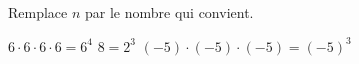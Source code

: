 %
%
	Remplace \(n\) par le nombre qui convient.
	\begin{tasks}
		\task \(6\cdot 6 \cdot 6 \cdot 6 = 6^4\)
		\task \(8=2^3\)
		\task \((-5)\cdot(-5)\cdot(-5) = (-5)^3\)
	\end{tasks}

